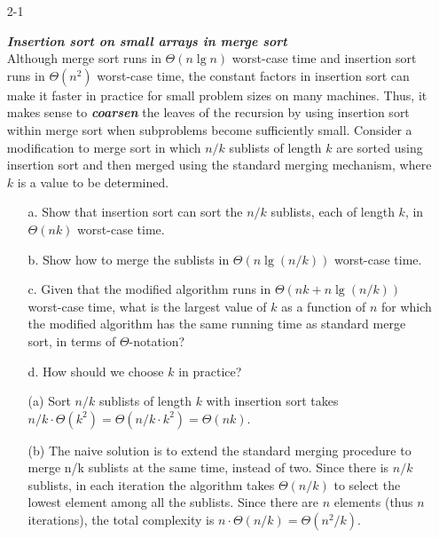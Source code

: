 \begin{enumerate}

\item[2{-}1]{\textbf{\emph{Insertion sort on small arrays in merge sort}}\\
Although merge sort runs in $\Theta(n \lg n)$ worst-case time and insertion sort
runs in $\Theta(n^2)$ worst-case time, the constant factors in insertion sort can make
it faster in practice for small problem sizes on many machines. Thus, it makes
sense to \textbf{\emph{coarsen}} the leaves of the recursion by using insertion
sort within merge sort when subproblems become sufficiently small. Consider
a modification to merge sort in which $n/k$ sublists of length $k$ are sorted
using insertion sort and then merged using the standard merging mechanism, where
$k$ is a value to be determined.

\begin{enumerate}
\item[a.] Show that insertion sort can sort the $n/k$ sublists, each of length
  $k$, in $\Theta(n k)$ worst-case time.
\item[b.] Show how to merge the sublists in $\Theta(n \lg(n/k))$ worst-case time.
\item[c.] Given that the modified algorithm runs in $\Theta(n k + n \lg(n/k))$
  worst-case time, what is the largest value of $k$ as a function of $n$ for
  which the modified algorithm has the same running time as standard merge sort,
  in terms of $\Theta$-notation?
\item[d.] How should we choose $k$ in practice?
\end{enumerate}
}

\begin{framed}

\begin{enumerate}
\item[(a)] Sort $n/k$ sublists of length $k$ with insertion sort takes
$n/k \cdot \Theta(k^2) = \Theta(n/k \cdot k^2) = \Theta(nk)$.

\item[(b)] The naive solution is to extend the standard merging procedure to
merge n/k sublists at the same time, instead of two. Since there is $n/k$
sublists, in each iteration the algorithm takes $\Theta(n/k)$ to select the
lowest element among all the sublists. Since there are $n$ elements (thus $n$
iterations), the total complexity is $n \cdot \Theta(n/k) = \Theta({n^2}/k)$.


\end{enumerate}
\end{framed}
\end{enumerate}
